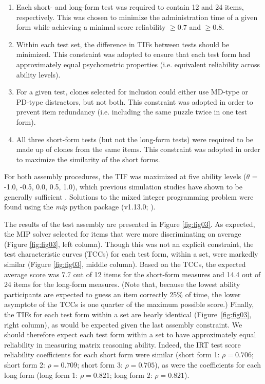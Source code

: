 \documentclass[a4paper,man,natbib]{apa6}
\begin{document}
\begin{enumerate}

    \item Each short- and long-form test was required to contain 12 and 24 items, respectively. This was chosen to minimize the administration time of a given form while achieving a minimal score reliability $\geq 0.7$ and $\geq 0.8$.
        
    \item Within each test set, the difference in TIFs between tests should be minimized. This constraint was adopted to ensure that each test form had approximately equal psychometric properties (i.e. equivalent reliability across ability levels). 
        
    \item For a given test, clones selected for inclusion could either use MD-type or PD-type distractors, but not both. This constraint was adopted in order to prevent item redundancy (i.e. including the same puzzle twice in one test form).
        
    \item All three short-form tests (but not the long-form tests) were required to be made up of clones from the same items. This constraint was adopted in order to maximize the similarity of the short forms.
    
\end{enumerate}

\noindent For both assembly procedures, the TIF was maximized at five ability levels ($\theta$ = -1.0, -0.5, 0.0, 0.5, 1.0), which previous simulation studies have shown to be generally sufficient \citep{der2005wj}. Solutions to the mixed integer programming problem were found using the \textit{mip} python package (v1.13.0; \citealt{santos2020mixed}).

The results of the test assembly are presented in Figure \ref{fig:fig03}. As expected, the MIP solver selected for items that were more discriminating on average (Figure \ref{fig:fig03}, left column). Though this was not an explicit constraint, the test characteristic curves (TCCs) for each test form, within a set, were markedly similar (Figure \ref{fig:fig03}, middle column). Based on the TCCs, the expected average score was 7.7 out of 12 items for the short-form measures and 14.4 out of 24 items for the long-form measures. (Note that, because the lowest ability participants are expected to guess an item correctly 25\% of time, the lower asymptote of the TCCs is one quarter of the maximum possible score.) Finally, the TIFs for each test form within a set are hearly identical (Figure~\ref{fig:fig03}, right column), as would be expected given the last assembly constraint. We should therefore expect each test form within a set to have approximately equal reliability in measuring matrix reasoning ability. Indeed, the IRT test score reliability coefficients \citep{kim2010estimation, nicewander2018conditional} for each short form were similar (short form 1: $\rho = 0.706$; short form 2: $\rho = 0.709$; short form 3: $\rho = 0.705$), as were the coefficients for each long form (long form 1: $\rho = 0.821$; long form 2: $\rho = 0.821$). 
\end{document}
